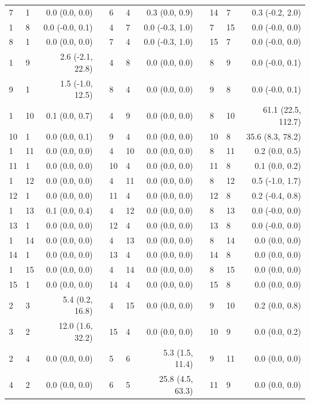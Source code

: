 \begin{xltabular}{\textwidth}{llrp{0.2cm}llrp{0.2cm}llr}
    7 & 1 & 0.0 (0.0, 0.0) & & 6 & 4 & 0.3 (0.0, 0.9) & & 14 & 7 & 0.3 (-0.2, 2.0) \\
    1 & 8 & 0.0 (-0.0, 0.1) & & 4 & 7 & 0.0 (-0.3, 1.0) & & 7 & 15 & 0.0 (-0.0, 0.0) \\
    8 & 1 & 0.0 (0.0, 0.0) & & 7 & 4 & 0.0 (-0.3, 1.0) & & 15 & 7 & 0.0 (-0.0, 0.0) \\
    1 & 9 & 2.6 (-2.1, 22.8) & & 4 & 8 & 0.0 (0.0, 0.0) & & 8 & 9 & 0.0 (-0.0, 0.1) \\
    9 & 1 & 1.5 (-1.0, 12.5) & & 8 & 4 & 0.0 (0.0, 0.0) & & 9 & 8 & 0.0 (-0.0, 0.1) \\
    1 & 10 & 0.1 (0.0, 0.7) & & 4 & 9 & 0.0 (0.0, 0.0) & & 8 & 10 & 61.1 (22.5, 112.7) \\
    10 & 1 & 0.0 (0.0, 0.1) & & 9 & 4 & 0.0 (0.0, 0.0) & & 10 & 8 & 35.6 (8.3, 78.2) \\
    1 & 11 & 0.0 (0.0, 0.0) & & 4 & 10 & 0.0 (0.0, 0.0) & & 8 & 11 & 0.2 (0.0, 0.5) \\
    11 & 1 & 0.0 (0.0, 0.0) & & 10 & 4 & 0.0 (0.0, 0.0) & & 11 & 8 & 0.1 (0.0, 0.2) \\
    1 & 12 & 0.0 (0.0, 0.0) & & 4 & 11 & 0.0 (0.0, 0.0) & & 8 & 12 & 0.5 (-1.0, 1.7) \\
    12 & 1 & 0.0 (0.0, 0.0) & & 11 & 4 & 0.0 (0.0, 0.0) & & 12 & 8 & 0.2 (-0.4, 0.8) \\
    1 & 13 & 0.1 (0.0, 0.4) & & 4 & 12 & 0.0 (0.0, 0.0) & & 8 & 13 & 0.0 (-0.0, 0.0) \\
    13 & 1 & 0.0 (0.0, 0.0) & & 12 & 4 & 0.0 (0.0, 0.0) & & 13 & 8 & 0.0 (-0.0, 0.0) \\
    1 & 14 & 0.0 (0.0, 0.0) & & 4 & 13 & 0.0 (0.0, 0.0) & & 8 & 14 & 0.0 (0.0, 0.0) \\
    14 & 1 & 0.0 (0.0, 0.0) & & 13 & 4 & 0.0 (0.0, 0.0) & & 14 & 8 & 0.0 (0.0, 0.0) \\
    1 & 15 & 0.0 (0.0, 0.0) & & 4 & 14 & 0.0 (0.0, 0.0) & & 8 & 15 & 0.0 (0.0, 0.0) \\
    15 & 1 & 0.0 (0.0, 0.0) & & 14 & 4 & 0.0 (0.0, 0.0) & & 15 & 8 & 0.0 (0.0, 0.0) \\
    2 & 3 & 5.4 (0.2, 16.8) & & 4 & 15 & 0.0 (0.0, 0.0) & & 9 & 10 & 0.2 (0.0, 0.8) \\
    3 & 2 & 12.0 (1.6, 32.2) & & 15 & 4 & 0.0 (0.0, 0.0) & & 10 & 9 & 0.0 (0.0, 0.2) \\
    2 & 4 & 0.0 (0.0, 0.0) & & 5 & 6 & 5.3 (1.5, 11.4) & & 9 & 11 & 0.0 (0.0, 0.0) \\
    4 & 2 & 0.0 (0.0, 0.0) & & 6 & 5 & 25.8 (4.5, 63.3) & & 11 & 9 & 0.0 (0.0, 0.0) \\

\end{xltabular}

